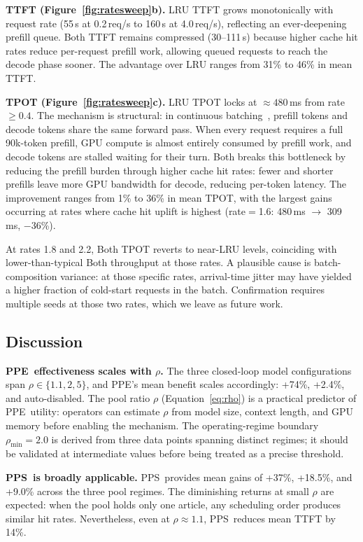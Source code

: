 \documentclass[journal]{IEEEtran}
\newcommand{\ppe}{\textsc{PPE}}
\newcommand{\pps}{\textsc{PPS}}
\newcommand{\rhomin}{\rho_{\min}}
\begin{document}
\textbf{TTFT (Figure~\ref{fig:ratesweep}b).}
LRU TTFT grows monotonically with request rate (55\,s at 0.2\,req/s to
160\,s at 4.0\,req/s), reflecting an ever-deepening prefill queue.  Both TTFT
remains compressed (30--111\,s) because higher cache hit rates reduce
per-request prefill work, allowing queued requests to reach the decode phase
sooner.  The advantage over LRU ranges from 31\% to 46\% in mean TTFT.

\textbf{TPOT (Figure~\ref{fig:ratesweep}c).}
LRU TPOT locks at $\approx480$\,ms from rate $\geq0.4$.  The mechanism is
structural: in continuous batching~\cite{yu2022orca}, prefill tokens and decode
tokens share the same forward pass.  When every request requires a full
90k-token prefill, GPU compute is almost entirely consumed by prefill work,
and decode tokens are stalled waiting for their turn.  Both breaks this
bottleneck by reducing the prefill burden through higher cache hit rates: fewer
and shorter prefills leave more GPU bandwidth for decode, reducing per-token
latency.  The improvement ranges from 1\% to 36\% in mean TPOT, with the
largest gains occurring at rates where cache hit uplift is highest
(rate$=$1.6: 480\,ms $\to$ 309\,ms, $-$36\%).

At rates 1.8 and 2.2, Both TPOT reverts to near-LRU levels, coinciding with
lower-than-typical Both throughput at those rates.  A plausible cause is
batch-composition variance: at those specific rates, arrival-time jitter
may have yielded a higher fraction of cold-start requests in the batch.
Confirmation requires multiple seeds at those two rates, which we leave as
future work.

\subsection{Discussion}
\label{sec:discussion}

\textbf{\ppe\ effectiveness scales with $\rho$.}
The three closed-loop model configurations span $\rho\in\{1.1,2,5\}$, and
\ppe's mean benefit scales accordingly: +74\%, +2.4\%, and auto-disabled.
The pool ratio $\rho$ (Equation~\ref{eq:rho}) is a practical predictor of
\ppe\ utility: operators can estimate $\rho$ from model size, context length,
and GPU memory before enabling the mechanism.  The operating-regime boundary
$\rhomin=2.0$ is derived from three data points spanning distinct regimes;
it should be validated at intermediate values before being treated as a
precise threshold.

\textbf{\pps\ is broadly applicable.}
\pps\ provides mean gains of +37\%, +18.5\%, and +9.0\% across the three
pool regimes.  The diminishing returns at small $\rho$ are expected: when the
pool holds only one article, any scheduling order produces similar hit rates.
Nevertheless, even at $\rho\approx1.1$, \pps\ reduces mean TTFT by 14\%.
\end{document}
